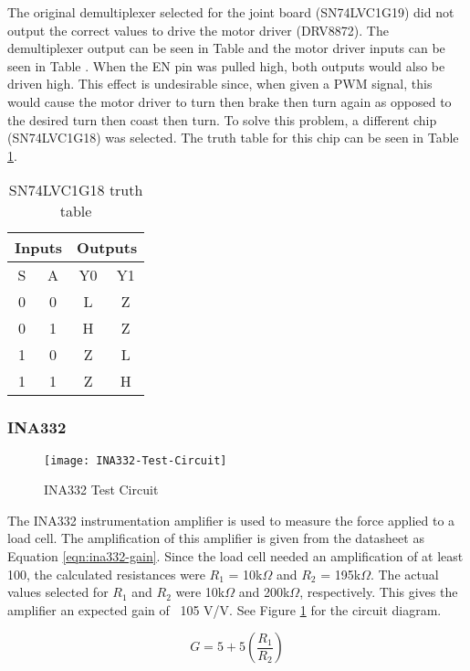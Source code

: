 \noindent The original demultiplexer selected for the joint board (SN74LVC1G19) did not output the correct values to drive the motor driver (DRV8872). The demultiplexer output can be seen in Table  and the motor driver inputs can be seen in Table . When the EN pin was pulled high, both outputs would also be driven high. This effect is undesirable since, when given a PWM signal, this would cause the motor driver to turn then brake then turn again as opposed to the desired turn then coast then turn. To solve this problem, a different chip (SN74LVC1G18) was selected. The truth table for this chip can be seen in Table \ref{tbl:sn74lvc1g18-truth}.
\begin{table}[H]
	\centering
	\caption{SN74LVC1G18 truth table}
	\begin{tabular}{| c  c | c  c| }
		\hline
		\multicolumn{2}{|c|}{Inputs} & \multicolumn{2}{c|}{Outputs} \\
		\hline
		S & A & Y0 & Y1 \\
		\hline
		0 & 0 & L & Z \\
		0 & 1 & H & Z \\
		1 & 0 & Z & L \\
		1 & 1 & Z & H \\
		\hline
	\end{tabular}
	\label{tbl:sn74lvc1g18-truth}
\end{table}

\subsubsection{INA332}
\label{sec:meth-ina332}

\begin{figure}[H]
	\centering
	\texttt{[image: INA332-Test-Circuit]}
	\caption{INA332 Test Circuit}
	\label{fig:INA332_Test_Circuit}
\end{figure}

\noindent The INA332 instrumentation amplifier is used to measure the force applied to a load cell. The amplification of this amplifier is given from the datasheet as Equation \ref{eqn:ina332-gain}. Since the load cell needed an amplification of at least 100, the calculated resistances were $R_1$ = 10k$\Omega$ and $R_2$ = 195k$\Omega$. The actual values selected for $R_1$ and $R_2$ were 10k$\Omega$ and 200k$\Omega$, respectively. This gives the amplifier an expected gain of ~105 V/V. See Figure \ref{fig:INA332_Test_Circuit} for the circuit diagram.

\begin{equation}
G = 5 + 5(\frac{R_1}{R_2})
\label{eqn:ina332-gain}
\end{equation}

